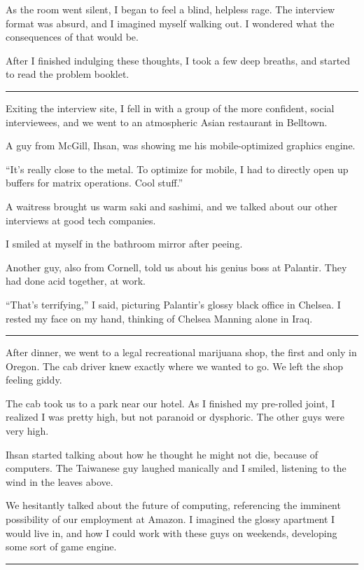 As the room went silent, I began to feel a blind, helpless rage.  The interview
format was absurd, and I imagined myself walking out.  I wondered what the
consequences of that would be.

After I finished indulging these thoughts, I took a few deep breaths, and
started to read the problem booklet.

\plainfancybreak{12pt}{2}{}

Exiting the interview site, I fell in with a group of the more confident, social
interviewees, and we went to an atmospheric Asian restaurant in Belltown.

A guy from McGill, Ihsan, was showing me his mobile-optimized graphics engine.

``It's really close to the metal.  To optimize for mobile, I had to directly
open up buffers for matrix operations.  Cool stuff.''

A waitress brought us warm saki and sashimi, and we talked about our other
interviews at good tech companies.

I smiled at myself in the bathroom mirror after peeing.

Another guy, also from Cornell, told us about his genius boss at Palantir.  They
had done acid together, at work.

``That's terrifying,'' I said, picturing Palantir's glossy black office in
Chelsea.  I rested my face on my hand, thinking of Chelsea Manning alone in
Iraq.

\plainfancybreak{12pt}{2}{}

After dinner, we went to a legal recreational marijuana shop, the first and only
in Oregon.  The cab driver knew exactly where we wanted to go.  We left the shop
feeling giddy.

The cab took us to a park near our hotel.  As I finished my pre-rolled joint, I
realized I was pretty high, but not paranoid or dysphoric.   The other guys were
very high.

Ihsan started talking about how he thought he might not die, because of
computers.  The Taiwanese guy laughed manically and I smiled, listening to the
wind in the leaves above.

We hesitantly talked about the future of computing, referencing the imminent
possibility of our employment at Amazon.  I imagined the glossy apartment I
would live in, and how I could work with these guys on weekends, developing some
sort of game engine.

\plainfancybreak{12pt}{2}{}

